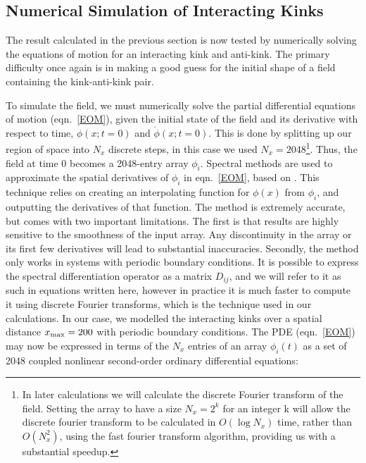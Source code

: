 \documentclass[11pt, oneside]{article}  	%
\numberwithin{equation}{section}
\begin{document}
\subsection{Numerical Simulation of Interacting Kinks} \label{kink_kink_comp}
The result calculated in the previous section is now tested by numerically solving the equations of motion for an interacting kink and anti-kink. The primary difficulty once again is in making a good guess for the initial shape of a field containing the kink-anti-kink pair.\par
To simulate the field, we must numerically solve the partial differential equations of motion (eqn.~\ref{EOM}), given the initial state of the field and its derivative with respect to time, $\phi(x;t=0)$ and $\dot{\phi}(x;t=0)$. This is done by splitting up our region of space into $N_x$ discrete steps, in this case we used $N_x = 2048$\footnote{In later calculations we will calculate the discrete Fourier transform of the field. Setting the array to have a size $N_x = 2^k$ for an integer k will allow the discrete fourier transform to be calculated in $O(\log N_x)$ time, rather than $O(N_x^2)$, using the fast fourier transform algorithm, providing us with a substantial speedup.}. Thus, the field at time 0 becomes a 2048-entry array $\phi_i$. Spectral methods are used to approximate the spatial derivatives of $\phi_i$ in eqn.~\ref{EOM}, based on \cite{spectral}. This technique relies on creating an interpolating function for $\phi(x)$ from $\phi_i$, and outputting the derivatives of that function. The method is extremely accurate, but comes with two important limitations. The first is that results are highly sensitive to the smoothness of the input array. Any discontinuity in the array or its first few derivatives will lead to substantial inaccuracies. Secondly, the method only works in systems with periodic boundary conditions. It is possible to express the spectral differentiation operator as a matrix $D_{ij}$, and we will refer to it as such in equations written here, however in practice it is much faster to compute it using discrete Fourier transforms, which is the technique used in our calculations. In our case, we modelled the interacting kinks over a spatial distance $x_\textup{max} = 200$ with periodic boundary conditions. The PDE (eqn.~\ref{EOM}) may now be expressed in terms of the $N_x$ entries of an array $\phi_i(t)$ as a set of 2048 coupled nonlinear second-order ordinary differential equations:
\end{document}
